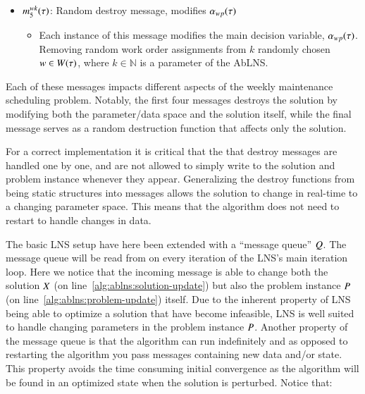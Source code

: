 \begin{itemize}
\begin{itemize}
	\end{itemize}
	\item $m^{wk}_{5}(\tau)$: Random destroy message, modifies $\alpha_{wp}(\tau)$
	\begin{itemize}
		\item Each instance of this message modifies the main decision variable, $\alpha_{wp}(\tau)$. 
			Removing random work order assignments from $k$ randomly chosen $\ElementWorkOrder \in \SetWorkOrder$, where $k\in\mathbb{N}$ is a parameter of the AbLNS.
	\end{itemize}
\end{itemize}

Each of these messages impacts different aspects of the weekly maintenance
scheduling problem. Notably, the first four messages destroys the solution by
modifying both the parameter/data space and the solution itself, while the final
message serves as a random destruction function that affects only the solution.

For a correct implementation it is critical that the that destroy messages
are  handled one by one, and are not allowed to simply write to the solution and
problem instance whenever they appear. Generalizing the destroy functions from being
static structures into messages allows the solution to change in real-time to a
changing parameter space. This means that the algorithm does not need to restart
to handle changes in data.



The basic LNS setup have here been extended with a ``message queue'' $
Q$. The message queue will be read from on every iteration of
the LNS's main iteration loop. Here we notice that the incoming message is
able to change both the solution $X$ (on line~\ref{alg:ablns:solution-update}) but also the problem instance $
P$ (on line~\ref{alg:ablns:problem-update}) itself. Due to the inherent property of LNS being able to
optimize a solution that have become infeasible, LNS is well suited to handle
changing parameters in the problem instance $P$. Another
property of the message queue is  that the algorithm can run indefinitely and
as opposed to restarting the algorithm you pass messages containing new data
and/or state. This property avoids the time consuming initial convergence as the
algorithm will be found in an optimized state when the solution is perturbed.
Notice that:

